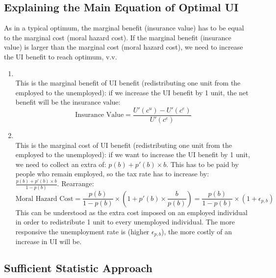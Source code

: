     \subsection{Explaining the Main Equation of Optimal UI}
        As in a typical optimum, the marginal benefit (insurance value) has to be equal to the marginal cost (moral hazard cost). If the marginal benefit (insurance value) is larger than the marginal cost (moral hazard cost), we need to increase the UI benefit to reach optimum, v.v.
        \begin{enumerate}
            \item \textbf{}\\
            This is the marginal benefit of UI benefit (redistributing one unit from the employed to the unemployed): if we increase the UI benefit by 1 unit, the net benefit will be the insurance value:
            $$\text{Insurance\ Value} = \frac{U'(c^u)-U'(c^e)}{U'(c^e)}$$
            \item \textbf{}\\
            This is the marginal cost of UI benefit (redistributing one unit from the employed to the unemployed): if we want to increase the UI benefit by 1 unit, we need to collect an extra of: $p(b) + p'(b)\times b$. This has to be paid by people who remain employed, so the tax rate has to increase by: $\frac{p(b)+p'(b)\times{b}}{1-p(b)}$. Rearrange:
            $$\text{Moral\ Hazard\ Cost} = \frac{p(b)}{1-p(b)}\times\left(1+p'(b)\times\frac{b}{p(b)}\right) = \frac{p(b)}{1-p(b)}\times(1+\epsilon_{p,b})$$
            This can be understood as the extra cost imposed on an employed individual in order to redistribute 1 unit to every unemployed individual. The more responsive the unemployment rate is (higher $\epsilon_{p,b}$), the more costly of an increase in UI will be.
        \end{enumerate}
        
    \subsection{Sufficient Statistic Approach}
    
